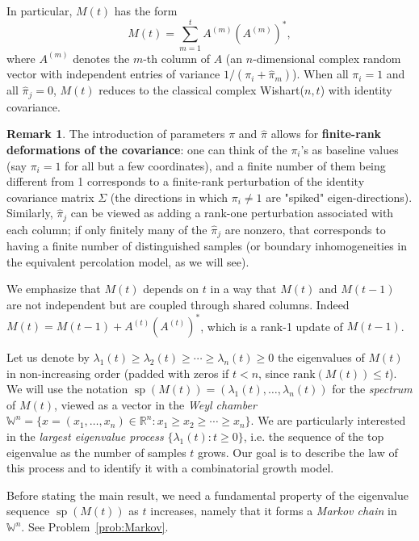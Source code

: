 \documentclass[letterpaper,11pt,oneside,reqno]{article}
\numberwithin{equation}{section}
\theoremstyle{definition}
\newtheorem{remark}[proposition]{Remark}
\begin{document}
In particular, $M(t)$ has the form
\[ M(t) = \sum_{m=1}^t A^{(m)} (A^{(m)})^*, \]
where $A^{(m)}$ denotes the $m$-th column of $A$ (an
$n$-dimensional complex random vector with independent
entries of variance $1/(\pi_i+\hat\pi_m)$). When all $\pi_i=1$ and all
$\hat\pi_j=0$, $M(t)$ reduces to the classical complex
Wishart($n,t$) with identity covariance.

\begin{remark}
	The introduction of parameters $\pi$ and $\hat\pi$ allows
	for \textbf{finite-rank deformations of the covariance}: one
	can think of the $\pi_i$'s as baseline values (say $\pi_i=1$
	for all but a few coordinates), and a finite number of them
	being different from 1 corresponds to a finite-rank
	perturbation of the identity covariance matrix $\Sigma$ (the
	directions in which $\pi_i\neq 1$ are "spiked"
	eigen-directions). Similarly, $\hat\pi_j$ can be viewed as
	adding a rank-one perturbation associated with each column;
	if only finitely many of the $\hat\pi_j$ are nonzero, that
	corresponds to having a finite number of distinguished
	samples (or boundary inhomogeneities in the equivalent
	percolation model, as we will see).
\end{remark}

We emphasize that $M(t)$
depends on $t$ in a way that $M(t)$ and $M(t-1)$ are not
independent but are coupled through shared columns. Indeed
$M(t) = M(t-1) + A^{(t)}(A^{(t)})^*$, which is a rank-1
update of $M(t-1)$.

\medskip
Let us denote by $\lambda_1(t)\ge \lambda_2(t)\ge \cdots \ge
\lambda_n(t)\ge 0$ the eigenvalues of $M(t)$ in
non-increasing order (padded with zeros if $t < n$, since
$\mathrm{rank}(M(t)) \le t$). We will use the notation
$\operatorname{sp}(M(t)) =
(\lambda_1(t),\dots,\lambda_n(t))$ for the \emph{spectrum}
of $M(t)$, viewed as a vector in the \emph{Weyl chamber}
$\mathbb{W}^n = \{x=(x_1,\dots,x_n)\in\mathbb{R}^n: x_1 \ge x_2 \ge
\cdots \ge x_n\}$. We are particularly interested in the
\emph{largest eigenvalue process}
$\{\lambda_1(t):t\ge0\}$, i.e. the sequence of the top
eigenvalue as the number of samples $t$ grows. Our goal is
to describe the law of this process and to identify it with
a combinatorial growth model.

Before stating the main result, we need a fundamental
property of the eigenvalue sequence
$\operatorname{sp}(M(t))$ as $t$ increases, namely that it
forms a \emph{Markov chain} in $\mathbb{W}^n$.
See Problem~\ref{prob:Markov}.
\end{document}
